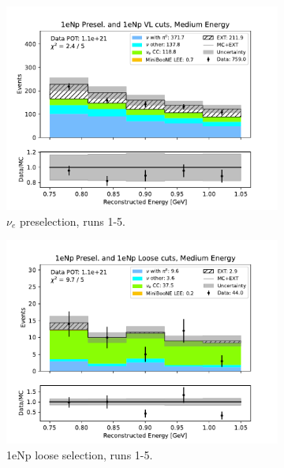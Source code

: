 \begin{figure}[H]
\begin{subfigure}{0.33\linewidth}
        \includegraphics[width=\linewidth]{technote/Sidebands/Figures/NearSideband/near_sideband_reco_e_run1234b4c4d5_NP_NP_MEDIUM_ENERGY.pdf}
        \caption{$\nu_e$ preselection, runs 1-5.}
    \end{subfigure}%
    \begin{subfigure}{0.33\linewidth}
        \includegraphics[width=\linewidth]{technote/Sidebands/Figures/NearSideband/near_sideband_reco_e_run1234b4c4d5_NP_NPL_MEDIUM_ENERGY.pdf}
        \caption{1eNp loose selection, runs 1-5.}
    \end{subfigure}%
    \begin{subfigure}{0.33\linewidth}

\end{subfigure}
\end{figure}
